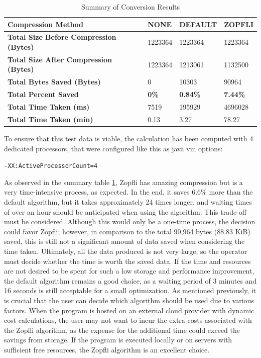 \begin{table}[h]
    \centering
    \begin{tabular}{|p{7cm}|p{2.1cm}|p{2.1cm}|p{2.1cm}|}
        \hline
        \textbf{Compression Method} & \textbf{NONE} & \textbf{DEFAULT} & \textbf{ZOPFLI} \\ \hline
        \textbf{Total Size Before Compression (Bytes)} & 1223364 & 1223364 & 1223364 \\ \hline
        \textbf{Total Size After Compression (Bytes)} & 1223364 & 1213061 & 1132500 \\ \hline
        \textbf{Total Bytes Saved (Bytes)} & 0 & 10303 & 90964 \\ \hline
        \textbf{Total Percent Saved} & \textbf{0\%} & \textbf{0.84\%} & \textbf{7.44\%} \\ \hline
        \textbf{Total Time Taken (ms)} & 7519 & 195929 & 4696028 \\ \hline
        \textbf{Total Time Taken (min)} & 0.13 & 3.27 & 78.27 \\ \hline
    \end{tabular}
    \caption{Summary of Conversion Results}
    \label{tab:summary_compression}
\end{table}

To ensure that this test data is viable, the calculation has been computed with 4 dedicated processors, that were configured like this as java vm options:

\texttt{-XX:ActiveProcessorCount=4}

As observed in the summary table \ref{tab:summary_compression}, Zopfli has amazing compression but is a very time-intensive process, as expected. In the end, it saves 6.6\% more than the default algorithm, but it takes approximately 24 times longer, and waiting times of over an hour should be anticipated when using the algorithm. This trade-off must be considered. Although this would only be a one-time process, the decision could favor Zopfli; however, in comparison to the total 90,964 bytes (88.83 KiB) saved, this is still not a significant amount of data saved when considering the time taken. Ultimately, all the data produced is not very large, so the operator must decide whether the time is worth the saved data. If the time and resources are not desired to be spent for such a low storage and performance improvement, the default algorithm remains a good choice, as a waiting period of 3 minutes and 16 seconds is still acceptable for a small optimization. As mentioned previously, it is crucial that the user can decide which algorithm should be used due to various factors. When the program is hosted on an external cloud provider with dynamic cost calculations, the user may not want to incur the extra costs associated with the Zopfli algorithm, as the expense for the additional time could exceed the savings from storage. If the program is executed locally or on servers with sufficient free resources, the Zopfli algorithm is an excellent choice.

